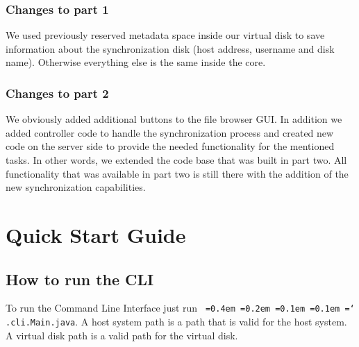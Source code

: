 \documentclass[a4paper,12pt]{article}
\newcommand*\justify{%
  \fontdimen2\font=0.4em%
  \fontdimen3\font=0.2em%
  \fontdimen4\font=0.1em%
  \fontdimen7\font=0.1em%
  \hyphenchar\font=`\-%
}
\newcommand{\mono}[1]{\texttt{\justify #1}}
\begin{document}
\subsubsection{Changes to part 1}
We used previously reserved metadata space inside our virtual disk to save information about the synchronization disk (host address, username and disk name). Otherwise everything else is the same inside the core.

\subsubsection{Changes to part 2}
We obviously added additional buttons to the file browser GUI. In addition we added controller code to handle the synchronization process and created new code on the server side to provide the needed functionality for the mentioned tasks. In other words, we extended the code base that was built in part two. All functionality that was available in part two is still there with the addition of the new synchronization capabilities.



\section{Quick Start Guide}

\subsection{How to run the CLI}
To run the Command Line Interface just run \mono{.cli.Main.java}. A host system path is a path that is valid for the host system. A virtual disk path is a valid path for the virtual disk.
\end{document}
